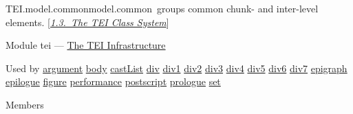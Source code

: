 \begin{reflist}
\item[]\begin{specHead}{TEI.model.common}{model.common} groups common chunk- and inter-level elements. [\textit{\hyperref[STEC]{1.3.\ The TEI Class System}}]\end{specHead} 
    \item[{Module}]
  tei — \hyperref[ST]{The TEI Infrastructure}
    \item[{Used by}]
  \hyperref[TEI.argument]{argument} \hyperref[TEI.body]{body} \hyperref[TEI.castList]{castList} \hyperref[TEI.div]{div} \hyperref[TEI.div1]{div1} \hyperref[TEI.div2]{div2} \hyperref[TEI.div3]{div3} \hyperref[TEI.div4]{div4} \hyperref[TEI.div5]{div5} \hyperref[TEI.div6]{div6} \hyperref[TEI.div7]{div7} \hyperref[TEI.epigraph]{epigraph} \hyperref[TEI.epilogue]{epilogue} \hyperref[TEI.figure]{figure} \hyperref[TEI.performance]{performance} \hyperref[TEI.postscript]{postscript} \hyperref[TEI.prologue]{prologue} \hyperref[TEI.set]{set}
    \item[{Members}]

\end{reflist}
